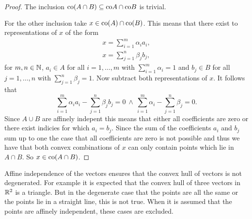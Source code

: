 \begin{proof}
  The inclusion ${\rm co}(A\cap B) \subseteq {\rm co}A \cap {\rm co}B$ is trivial.

  For the other inclusion take $x \in {\rm co}(A) \cap {\rm co}(B)$. This means that there exist to representations of $x$ of the form
  \begin{align*}
    x = \sum\limits_{i=1}^m\alpha_i a_i, \\
    x = \sum\limits_{j=1}^n\beta_j b_j,
  \end{align*}
  for $m,n \in \mathbb{N}$, $a_i \in A$ for all $i = 1, \ldots, m$ with $\sum\limits_{i=1}^m \alpha_i = 1$ and $b_j \in B$ for all $j =1, \ldots,n$ with $\sum\limits_{j=1}^n\beta_j = 1$.
  Now subtract both representations of $x$. It follows that
  \begin{equation*}
    \sum\limits_{i=1}^m\alpha_i a_i - \sum\limits_{j=1}^n\beta_j b_j = 0 \: \land \: \sum\limits_{i=1}^m \alpha_i - \sum\limits_{j=1}^n\beta_j = 0.
  \end{equation*}
  Since $A \cup B$ are affinely indepent this means that either all coefficients are zero or there exist indicies for which $a_i = b_j$. Since the sum of the coefficients $a_i$ and $b_j$ sum up to one the case that all coefficients are zero is not possible and thus we have that both convex combinations of $x$ can only contain points which lie in $A \cap B$. So $x \in {\rm co}(A\cap B)$.
\end{proof}

Affine independence of the vectors ensures that the convex hull of vectors is not degenerated.
For example it is expected that the convex hull of three vectors in $\mathbb{R}^2$ is a triangle. But in the degenerate case that the points are all the same
or the points lie in a straight line, this is not true. When it is assumed that the points are affinely independent, these cases are excluded. 

